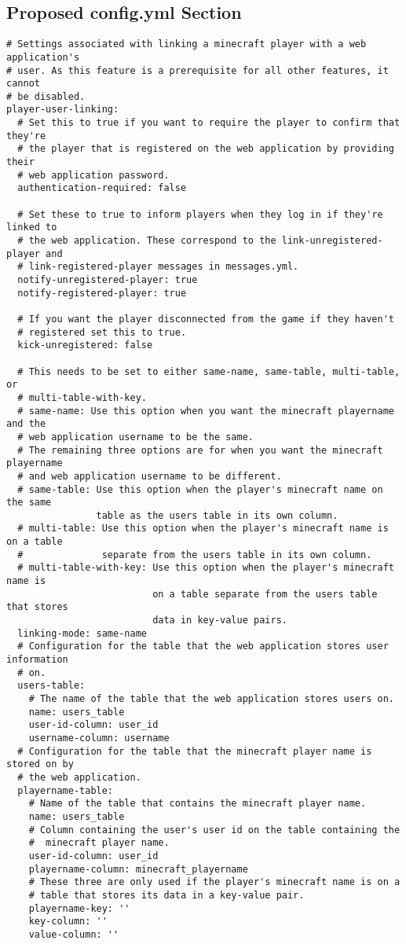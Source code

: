 \documentclass[letterpaper,12pt]{article}
\begin{document}
  \subsection{Proposed config.yml Section}
  \begin{verbatim}
# Settings associated with linking a minecraft player with a web application's
# user. As this feature is a prerequisite for all other features, it cannot
# be disabled. 
player-user-linking:
  # Set this to true if you want to require the player to confirm that they're
  # the player that is registered on the web application by providing their
  # web application password.
  authentication-required: false

  # Set these to true to inform players when they log in if they're linked to
  # the web application. These correspond to the link-unregistered-player and
  # link-registered-player messages in messages.yml.
  notify-unregistered-player: true
  notify-registered-player: true

  # If you want the player disconnected from the game if they haven't
  # registered set this to true.
  kick-unregistered: false

  # This needs to be set to either same-name, same-table, multi-table, or
  # multi-table-with-key.
  # same-name: Use this option when you want the minecraft playername and the
  # web application username to be the same.
  # The remaining three options are for when you want the minecraft playername
  # and web application username to be different.
  # same-table: Use this option when the player's minecraft name on the same
                table as the users table in its own column.
  # multi-table: Use this option when the player's minecraft name is on a table
  #              separate from the users table in its own column.
  # multi-table-with-key: Use this option when the player's minecraft name is
                          on a table separate from the users table that stores
                          data in key-value pairs.
  linking-mode: same-name
  # Configuration for the table that the web application stores user information
  # on.
  users-table:
    # The name of the table that the web application stores users on.
    name: users_table
    user-id-column: user_id
    username-column: username
  # Configuration for the table that the minecraft player name is stored on by
  # the web application.
  playername-table:
    # Name of the table that contains the minecraft player name.
    name: users_table
    # Column containing the user's user id on the table containing the
    #  minecraft player name.
    user-id-column: user_id
    playername-column: minecraft_playername
    # These three are only used if the player's minecraft name is on a
    # table that stores its data in a key-value pair.
    playername-key: ''
    key-column: ''
    value-column: ''
  \end{verbatim}
\end{document}
